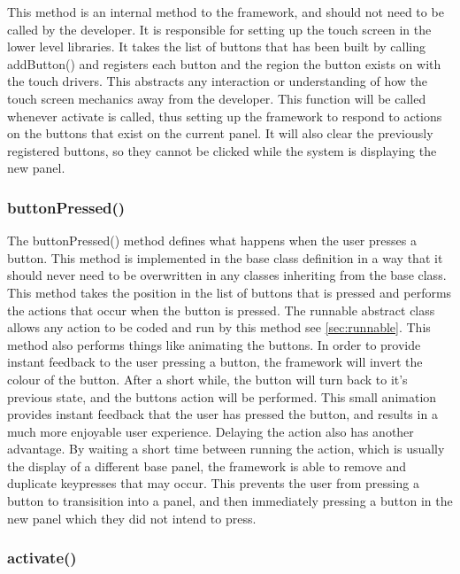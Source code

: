 This method is an internal method to the framework, and should not need to be called by the developer. It is responsible for setting up the touch screen in the lower level libraries. It takes the list of buttons that has been built by calling addButton() and registers each button and the region the button exists on with the touch drivers. This abstracts any interaction or understanding of how the touch screen mechanics away from the developer. This function will be called whenever activate is called, thus setting up the framework to respond to actions on the buttons that exist on the current panel. It will also clear the previously registered buttons, so they cannot be clicked while the system is displaying the new panel.

\subsubsection{buttonPressed()}
\label{sec:base:butpress}
The buttonPressed() method defines what happens when the user presses a button. This method is implemented in the base class definition in a way that it should never need to be overwritten in any classes inheriting from the base class. This method takes the position in the list of buttons that is pressed and performs the actions that occur when the button is pressed. The runnable abstract class allows any action to be coded and run by this method see \ref{sec:runnable}. This method also performs things like animating the buttons. In order to provide instant feedback to the user pressing a button, the framework will invert the colour of the button. After a short while, the button will turn back to it's previous state, and the buttons action will be performed. This small animation provides instant feedback that the user has pressed the button, and results in a much more enjoyable user experience. Delaying the action also has another advantage. By waiting a short time between running the action, which is usually the display of a different base panel, the framework is able to remove and duplicate keypresses that may occur. This prevents the user from pressing a button to transisition into a panel, and then immediately pressing a button in the new panel which they did not intend to press.

\subsubsection{activate()}
\label{sec:activate}

